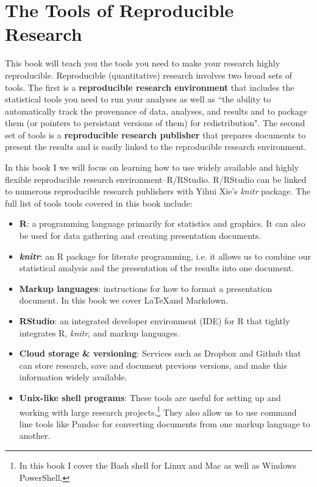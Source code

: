 \documentclass[ChapterTOCs,krantz1]{krantz}\usepackage{graphicx, color}
\begin{document}
\section{The Tools of Reproducible Research}

This book will teach you the tools you need to make your research highly reproducible. Reproducible (quantitative) research involves two broad sets of tools. The first is a {\bf{reproducible research environment}} that includes the statistical tools you need to run your analyses as well as ``the ability to automatically track the provenance of data, analyses, and results and to package them (or pointers to persistant versions of them) for redistribution". The second set of tools is a {\bf{reproducible research publisher}} that prepares documents to present the results and is easily linked to the reproducible research environment.\cite{Mesirov2010}

In this book I we will focus on learning how to use widely available and highly flexible reproducible research environment--R/RStudio. R/RStudio can be linked to numerous reproducible research publishers with Yihui Xie's {\emph{knitr}} package. The full list of tools tools covered in this book include:

\begin{itemize}
    \item {\bf{R}}: a programming language primarily for statistics and graphics. It can also be used for data gathering and creating presentation documents.
    
    \item {\bf{{\emph{knitr}}}}: an R package for literate programming, i.e. it allows us to combine our statistical analysis and the presentation of the results into one document.
    
    \item {\bf{Markup languages}}: instructions for how to format a presentation document. In this book we cover \LaTeX and Markdown.  
    
    \item {\bf{RStudio}}: an integrated developer environment (IDE) for R that tightly integrates R, {\emph{knitr}}, and markup languages.
    
    \item {\bf{Cloud storage \& versioning}}: Services such as Dropbox and Github that can store research, save and document previous versions, and make this information widely available.
    
    \item {\bf{Unix-like shell programs}}: These tools are useful for setting up and working with large research projects.\footnote{In this book I cover the Bash shell for Linux and Mac as well as Windows PowerShell.} They also allow us to use command line tools like Pandoc for converting documents from one markup language to another.
\end{itemize}
\end{document}
